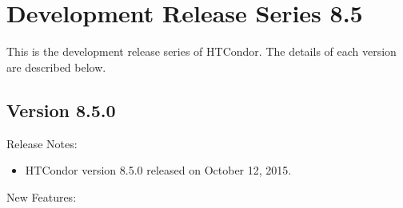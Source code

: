 
\section{\label{sec:History-8-5}Development Release Series 8.5}

This is the development release series of HTCondor.
The details of each version are described below.


\subsection*{\label{sec:New-8-5-0}Version 8.5.0}

\noindent Release Notes:

\begin{itemize}

\item HTCondor version 8.5.0 released on October 12, 2015.

\end{itemize}


\noindent New Features:

